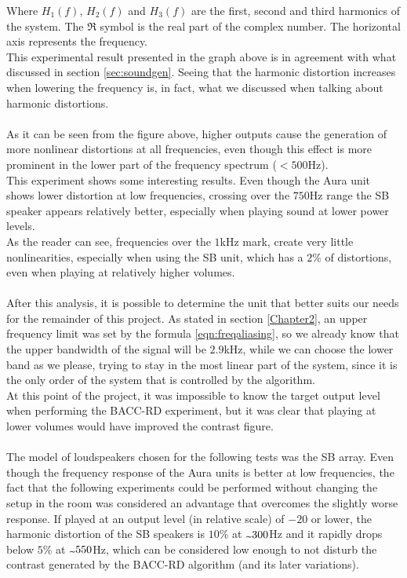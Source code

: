 Where $H_1(f)$, $H_2(f)$ and $H_3(f)$ are the first, second and third harmonics of the system. The $\Re$ symbol is the real part of the complex number. The horizontal axis represents the frequency.
\\
This experimental result presented in the graph above is in agreement with what discussed in section \ref{sec:soundgen}. Seeing that the harmonic distortion increases when lowering the frequency is, in fact, what we discussed when talking about harmonic distortions.
\\
\\
As it can be seen from the figure above, higher outputs cause the generation of more nonlinear distortions at all frequencies, even though this effect is more prominent in the lower part of the frequency spectrum ($<500$Hz).
\\
This experiment shows some interesting results. Even though the Aura unit shows lower distortion at low frequencies, crossing over the $750$Hz range the SB speaker appears relatively better, especially when playing sound at lower power levels.
\\
As the reader can see, frequencies over the $1$kHz mark, create very little nonlinearities, especially when using the SB unit, which has a $2\%$ of distortions, even when playing at relatively higher volumes. 
\\
\\
After this analysis, it is possible to determine the unit that better suits our needs for the remainder of this project. As stated in section \ref{Chapter2}, an upper frequency limit was set by the formula \ref{eqn:freqaliasing}, so we already know that the upper bandwidth of the signal will be $2.9$kHz, while we can choose the lower band as we please, trying to stay in the most linear part of the system, since it is the only order of the system that is controlled by the algorithm.
\\
At this point of the project, it was impossible to know the target output level when performing the BACC-RD experiment, but it was clear that playing at lower volumes would have improved the contrast figure.
\\
\\
The model of loudspeakers chosen for the following tests was the SB array. Even though the frequency response of the Aura units is better at low frequencies, the fact that the following experiments could be performed without changing the setup in the room was considered an advantage that overcomes the slightly worse response. If played at an output level (in relative scale) of $-20$ or lower, the harmonic distortion of the SB speakers is $10\%$ at $\tld 300$Hz and it rapidly drops below $5\%$ at $\tld 550$Hz, which can be considered low enough to not disturb the contrast generated by the BACC-RD algorithm (and its later variations).
